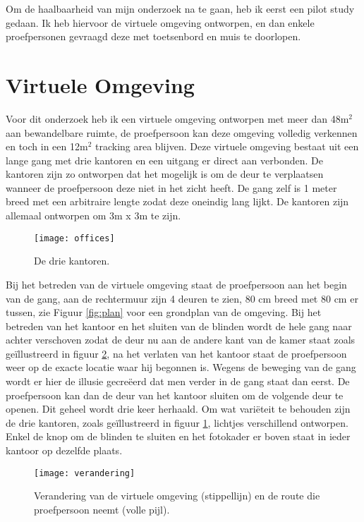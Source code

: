 Om de haalbaarheid van mijn onderzoek na te gaan, heb ik eerst een pilot study
gedaan. Ik heb hiervoor de virtuele omgeving ontworpen, en dan enkele
proefpersonen gevraagd deze met toetsenbord en muis te doorlopen.

\section{Virtuele Omgeving}
Voor dit onderzoek heb ik een virtuele omgeving ontworpen met meer dan 48m$^2$
aan bewandelbare ruimte, de proefpersoon kan deze omgeving volledig verkennen en
toch in een 12m$^2$ tracking area blijven. Deze virtuele omgeving bestaat uit 
een lange gang met drie kantoren en een uitgang er direct aan verbonden. De 
kantoren zijn zo ontworpen dat het mogelijk is om de deur te verplaatsen wanneer 
de proefpersoon deze niet in het zicht heeft. De gang zelf is 1 meter breed met 
een arbitraire lengte zodat deze oneindig lang lijkt. De kantoren zijn allemaal 
ontworpen om 3m x 3m te zijn. 

\begin{figure}[b!]
    \centering
    \texttt{[image: offices]}
    \caption{De drie kantoren.}
    \label{fig:kantoren}
\end{figure}

Bij het betreden van de virtuele omgeving staat de proefpersoon aan het begin van
de gang, aan de rechtermuur zijn 4 deuren te zien, 80 cm breed met 80 cm er
tussen, zie Figuur \ref{fig:plan} voor een grondplan van de omgeving. Bij het 
betreden van het kantoor en het sluiten van de blinden wordt de hele gang naar 
achter verschoven zodat de deur nu aan de andere kant van de kamer staat zoals 
ge\"illustreerd in figuur \ref{fig:verandering}, na het verlaten van het kantoor 
staat de proefpersoon weer op de exacte locatie waar hij begonnen is. Wegens de 
beweging van de gang wordt er hier de illusie gecre\"eerd dat men verder in de 
gang staat dan eerst. De proefpersoon kan dan de deur van het kantoor sluiten 
om de volgende deur te openen. Dit geheel wordt drie keer herhaald. Om wat 
vari\"eteit te behouden zijn de drie kantoren, zoals ge\"illustreerd in 
figuur \ref{fig:kantoren}, lichtjes verschillend ontworpen. Enkel de knop om 
de blinden te sluiten en het fotokader er boven staat in ieder kantoor op 
dezelfde plaats.

\begin{figure}[t!]
    \centering
    \texttt{[image: verandering]}
    \caption{Verandering van de virtuele omgeving (stippellijn) en de route die
    proefpersoon neemt (volle pijl).}
    \label{fig:verandering}
\end{figure}

